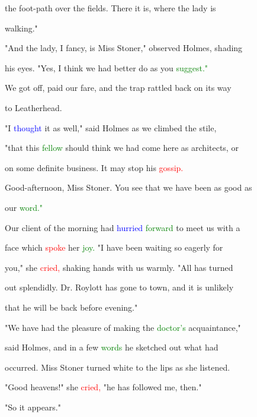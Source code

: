  the foot-path over the fields. There it is, where the lady is

 walking."



 "And the lady, I \textcolor{BurntOrange}{fancy,} is Miss Stoner," observed Holmes, shading

 his eyes. "Yes, I think we had better do as you \textcolor{green}{suggest."}



 We got off, paid our fare, and the trap rattled back on its way

 to Leatherhead.



 "I \textcolor{blue}{thought} it as well," said Holmes as we climbed the stile,

 "that this \textcolor{green}{fellow} should think we had come here as architects, or

 on some definite business. It may stop his \textcolor{red}{gossip.}

 Good-afternoon, Miss Stoner. You see that we have been as \textcolor{BurntOrange}{good} as

 our \textcolor{green}{word."}



 Our client of the morning had \textcolor{blue}{hurried} \textcolor{green}{forward} to meet us with a

 face which \textcolor{red}{spoke} her \textcolor{green}{joy.} "I have been \textcolor{BurntOrange}{waiting} so eagerly for

 you," she \textcolor{red}{cried,} shaking hands with us warmly. "All has turned

 out splendidly. Dr. Roylott has gone to town, and it is unlikely

 that he will be back before evening."



 "We have had the pleasure of making the \textcolor{green}{doctor's} acquaintance,"

 said Holmes, and in a few \textcolor{green}{words} he sketched out what had

 occurred. Miss Stoner turned \textcolor{BurntOrange}{white} to the lips as she listened.



 \textcolor{BurntOrange}{"Good} heavens!" she \textcolor{red}{cried,} "he has followed me, then."



 "So it appears."



